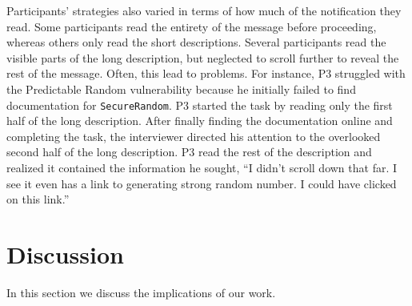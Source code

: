 \documentclass[10pt,journal,compsoc]{IEEEtran}
\begin{document}
Participants' strategies also varied in terms of how much of the notification they read.
Some participants read the entirety of the message before proceeding, whereas others only read the short descriptions. 
Several participants read the visible parts of the long description, but neglected to scroll further to reveal the rest of the message.
Often, this lead to problems. 
For instance, P3 struggled with the Predictable Random vulnerability because he initially failed to find documentation for \texttt{SecureRandom}.
P3 started the task by reading only the first half of the long description.
After finally finding the documentation online and completing the task, the interviewer directed his attention to the overlooked second half of the long description.
P3 read the rest of the description and realized it contained the information he sought,
``I didn't scroll down that far. I see it even has a link to generating strong random number. I could have clicked on this link.'' 












\section{Discussion}
\label{sec:discussion}
In this section we discuss the implications of our work.
\end{document}
